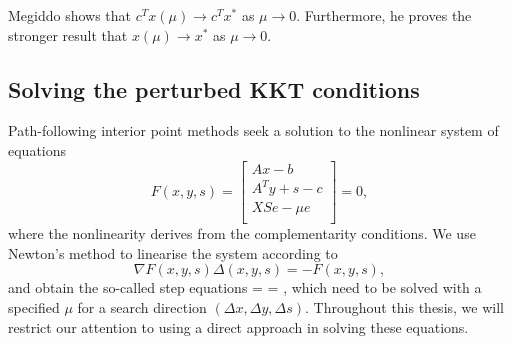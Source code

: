 Megiddo shows that $c^Tx(\mu)\to c^Tx^*$ as $\mu\to 0$. 
Furthermore, he proves the stronger result that 
$x(\mu)\to x^*$ as $\mu\to 0$.


%
%
\subsection{Solving the perturbed KKT conditions}

Path-following interior point methods seek a solution 
to the nonlinear system of equations
\[
F(x,y,s) = \left[
  \begin{array}{c}
    Ax-b \\
    A^Ty+s-c \\
    XSe - \mu e \\
  \end{array} \right] = 0,
\]
where the nonlinearity derives from the complementarity conditions.
We use Newton's method to linearise the system according to
\[
\nabla F(x,y,s) \Delta(x,y,s) = -F(x,y,s),
\]
and obtain the so-called step equations
%
\be \label{eq:NewtonSystem}
 =
 =
\left[ \begin{array}{c}
    \xi_b \\ \xi_c \\ \xi_\mu
   \end{array} \right],
\ee
%
which need to be solved with a specified $\mu$ for a search direction
$(\Delta x, \Delta y, \Delta s)$. Throughout this thesis, we will 
restrict our attention to using a direct approach in solving these
equations.


